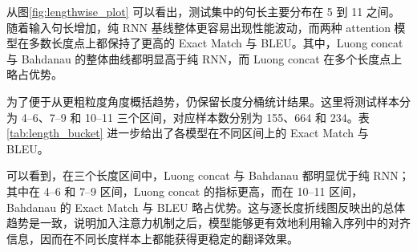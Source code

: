 \documentclass[a4paper]{article}
\begin{document}
从图\ref{fig:lengthwise_plot} 可以看出，测试集中的句长主要分布在 5 到 11 之间。随着输入句长增加，纯 RNN 基线整体更容易出现性能波动，而两种 attention 模型在多数长度点上都保持了更高的 Exact Match 与 BLEU。其中，Luong concat 与 Bahdanau 的整体曲线都明显高于纯 RNN，而 Luong concat 在多个长度点上略占优势。

为了便于从更粗粒度角度概括趋势，仍保留长度分桶统计结果。这里将测试样本分为 4--6、7--9 和 10--11 三个区间，对应样本数分别为 155、664 和 234。表\ref{tab:length_bucket} 进一步给出了各模型在不同区间上的 Exact Match 与 BLEU。

\begin{table}[H]
    \centering
    \scriptsize
    \setlength{\tabcolsep}{4pt}
    \caption{不同句长区间下的测试表现}
    \label{tab:length_bucket}
\end{table}

可以看到，在三个长度区间中，Luong concat 与 Bahdanau 都明显优于纯 RNN；其中在 4--6 和 7--9 区间，Luong concat 的指标更高，而在 10--11 区间，Bahdanau 的 Exact Match 与 BLEU 略占优势。这与逐长度折线图反映出的总体趋势是一致，说明加入注意力机制之后，模型能够更有效地利用输入序列中的对齐信息，因而在不同长度样本上都能获得更稳定的翻译效果。

\end{document}
